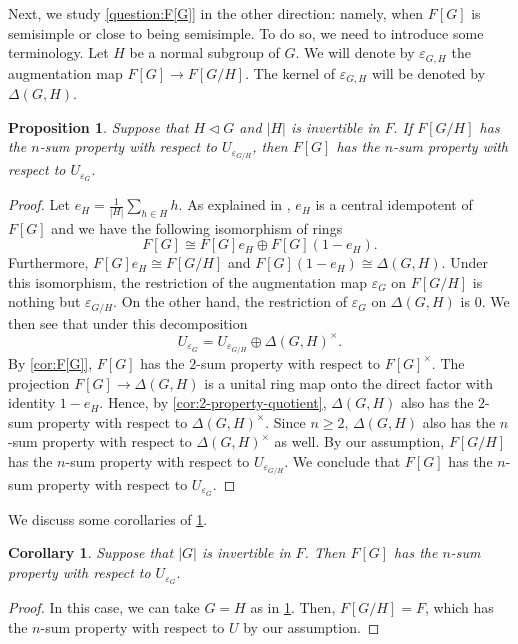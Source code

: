 \documentclass[11pt, a4paper]{amsart}
\newtheorem{prop}[thm]{Proposition}
\newtheorem{cor}[thm]{Corollary}
\theoremstyle{definition}
\numberwithin{equation}{section}
\begin{document}
Next, we study \cref{question:F[G]} in the other direction: namely, when $F[G]$ is semisimple or close to being semisimple. To do so, we need to introduce some terminology.  Let $H$ be a normal subgroup of $G.$ We will denote by $\varepsilon_{G,H}$ the augmentation map $F[G] \to F[G/H].$ The kernel of $\varepsilon_{G,H}$ will be denoted by $\Delta(G,H).$ 

\begin{prop} \label{prop:quotient-F[G]-semisimple}
    Suppose that $H \vartriangleleft G$ and $|H|$ is invertible in $F.$ If $F[G/H]$ has the $n$-sum property with respect to $U_{\varepsilon_{G/H}}$, then $F[G]$ has the $n$-sum property with respect to $U_{\varepsilon_{G}}.$ 
\end{prop}
\begin{proof}
    Let $e_H = \frac{1}{|H|} \sum_{h \in H}h.$ As explained  in \cite[Proposition 3.6.7]{GR}, $e_H$ is a central idempotent of $F[G]$ and we have the following isomorphism of rings 
    \[ F[G] \cong F[G]e_{H} \oplus F[G] (1-e_H).\]
    Furthermore, $F[G]e_H \cong F[G/H]$ and $F[G](1-e_H) \cong \Delta(G,H).$ Under this isomorphism, the restriction of the augmentation map $\varepsilon_{G}$ on $F[G/H]$ is nothing but $\varepsilon_{G/H}.$ On the other hand, the restriction of $\varepsilon_G$ on $\Delta(G,H)$ is $0.$ We then see that under this decomposition 
    \[ U_{\varepsilon_G} = U_{\varepsilon_{G/H}} \oplus \Delta(G,H)^{\times}.\]
    By \cref{cor:F[G]}, $F[G]$ has the $2$-sum property with respect to $F[G]^{\times}$. The projection \(F[G]\to \Delta(G,H)\) is a unital ring map onto the direct factor with identity \(1-e_H\). Hence, by \cref{cor:2-property-quotient}, $\Delta(G,H)$ also has the $2$-sum property with respect to $\Delta(G,H)^{\times}$. Since $n \geq 2$, $\Delta(G,H)$ also has the $n$-sum property with respect to $\Delta(G,H)^{\times}$ as well. By our assumption, $F[G/H]$ has the $n$-sum property with respect to $U_{\varepsilon_{G/H}}$. We conclude that $F[G]$ has the $n$-sum property with respect to $U_{\varepsilon_{G}}.$
\end{proof}
We discuss some corollaries of \cref{prop:quotient-F[G]-semisimple}. 

\begin{cor} \label{cor:semisimple}
    Suppose that $|G|$ is invertible in $F$. Then $F[G]$ has the $n$-sum property with respect to $U_{\varepsilon_G}.$
\end{cor}
\begin{proof}
    In this case, we can take $G=H$ as in \cref{prop:quotient-F[G]-semisimple}. Then, $F[G/H]=F$, which has the $n$-sum property with respect to $U$ by our assumption. 
\end{proof}
\end{document}
